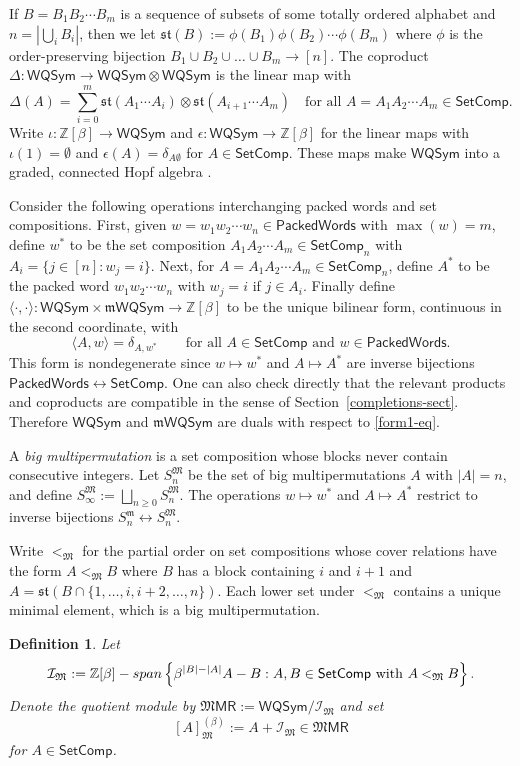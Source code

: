 \documentclass[11pt]{article}
\newtheorem{definition}[theo]{Definition}
\theoremstyle{definition}
\numberwithin{equation}{section}
\numberwithin{equation}{section}
\newcommand{\cI}{\mathcal{I}}
\newcommand{\ZZ}{\mathbb{Z}}
\def\spanning{\textnormal{-span}}
\newcommand{\fk}{\mathfrak}
\newcommand{\be}{\begin{equation}}
\newcommand{\ee}{\end{equation}}
\newcommand{\st}{\mathfrak{st}}
\newcommand{\MMPR}{\mathfrak{M}\mathsf{MR}}
\newcommand{\PWords}{\mathsf{PackedWords}}
\newcommand{\SetComp}{\mathsf{SetComp}}
\newcommand{\mWQSym}{\m\mathsf{WQSym}}
\newcommand{\MWQSym}{\mathsf{WQSym}}
\newcommand{\Sm}{S^{\fk m}}
\newcommand{\SM}{S^{\fk M}}
\newcommand{\m}{\mathfrak{m}}
\newcommand{\M}{\mathfrak{M}}
\newcommand{\equivM}{\mathbin{<_\M}}
\newcommand{\cJM}{\cI_\M}
\newcommand{\defn}[1]{{\color{darkred}\emph{#1}}}
\begin{document}
If $B = B_1B_2\cdots B_m$ is a sequence of subsets of some totally ordered alphabet
and $n=|\bigcup_i B_i|$,
then we let $\st(B):=\phi(B_1) \phi(B_2)\cdots \phi(B_m)$
where $\phi$ is the   order-preserving bijection
$B_1 \cup B_2 \cup \dots \cup B_m \to [n]$.
%
The coproduct
$
\Delta : \MWQSym \to \MWQSym \otimes \MWQSym
$
is   the linear map with \[
\Delta(A) = \sum_{i=0}^m \st(A_1\cdots A_i) \otimes \st(A_{i+1}\cdots A_m)
\quad\text{for all $A=A_1A_2\cdots A_m \in \SetComp$.}\]
Write 
$\iota : \ZZ[\beta] \to \MWQSym$
and
$\epsilon : \MWQSym\to \ZZ[\beta]$
for the linear maps with
$\iota(1) =  \emptyset$
and
$\epsilon(A) = \delta_{A\emptyset}$ for $A \in \SetComp$.
These maps make  $\MWQSym$ into a graded, connected Hopf algebra \cite[\S2.1]{NovelliThibon}.

Consider the following operations interchanging packed words and set compositions.
First, given $w=w_1w_2\cdots w_n \in \PWords$ with $\max(w)=m$,
define $w^*$ to be the set composition $A_1A_2\cdots A_m \in \SetComp_n$
with $A_i = \{ j \in [n] : w_j = i\}$.
Next, for $A =A_1A_2\cdots A_m \in \SetComp_n$, define $A^*$
to be the packed word $w_1w_2\cdots w_n$ with $w_j = i$ if $j \in A_i$.
Finally define $\langle\cdot,\cdot\rangle : \MWQSym \times \mWQSym \to \ZZ[\beta]$ to be the unique bilinear
form,
continuous in the second coordinate, with
\be\label{form1-eq}
\langle A, w \rangle = \delta_{A,w^*}
\qquad\text{for all }A \in \SetComp\text{ and } w\in \PWords.
\ee
 This form is nondegenerate since  $w\mapsto w^*$ and $A \mapsto A^*$
are inverse bijections
$ \PWords \leftrightarrow \SetComp$.
One can also check directly that the relevant products and coproducts
 are compatible 
 in the sense of Section~\ref{completions-sect}.
Therefore $\MWQSym$ and $\mWQSym$ are duals
with respect to \eqref{form1-eq}.


 A \defn{big multipermutation} is a set composition whose blocks never contain
 consecutive integers. 
Let $\SM_n$ be the set of big multipermutations $A$
with $|A| = n$,
and define $\SM_\infty :=\bigsqcup_{n\geq 0} \SM_n$.
The operations $w\mapsto w^*$ and $A \mapsto A^*$
restrict to inverse bijections
$ \Sm_n \leftrightarrow \SM_n$. 

Write $\equivM$ for the partial order 
on set compositions whose cover relations have the form $A \equivM B$ where 
$B$ has a block containing $i$ and $i+1$
and $A = \st(B \cap \{1,\dots,i,i+2,\dots,n\})$.
Each lower set under $\equivM$ contains a unique minimal element, which is a big multipermutation.

\begin{definition}
Let \[
\cJM:=\ZZ[\beta]\spanning\left\{\beta^{|B|-|A|} A- B : A,B\in \SetComp\text{ with }A \equivM B\right\}.\]
Denote the quotient module by $\MMPR:=\MWQSym / \cJM$
and set
\[[A]^{(\beta)}_\M := A + \cJM \in \MMPR\]
for $A \in \SetComp$.
\end{definition}
\end{document}
